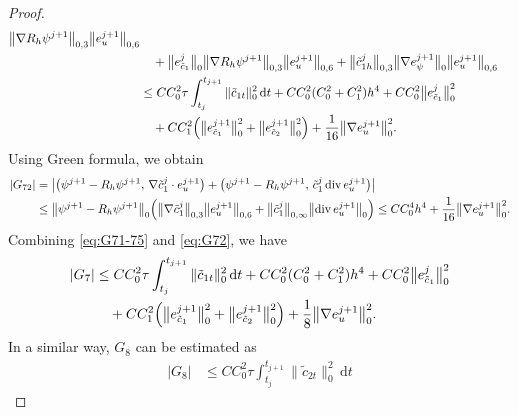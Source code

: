 \begin{proof}
\begin{align}
         \bigl\|\nabla R_{h}\psi^{j+1}\bigr\|_{0,3}\bigl\|e_{u}^{j+1}\bigr\|_{0,6}
  \nonumber\\
  &\quad + \bigl\|e_{\tilde{c}_{1}}^{j}\bigr\|_{0}
           \bigl\|\nabla R_{h}\psi^{j+1}\bigr\|_{0,3}\bigl\|e_{u}^{j+1}\bigr\|_{0,6}
         + \bigl\|\tilde{c}_{1h}^{j}\bigr\|_{0,3}
           \bigl\|\nabla e_{\psi}^{j+1}\bigr\|_{0}\bigl\|e_{u}^{j+1}\bigr\|_{0,6}
  \nonumber\\
  &\leq CC_{0}^{2}\tau\int_{t_{j}}^{t_{j+1}}\|\tilde{c}_{1t}\|_{0}^{2}\,\mathrm{d}t
    + CC_{0}^{2}(C_{0}^{2}+C_{1}^{2})h^{4}
    + CC_{0}^{2}\bigl\|e_{\tilde{c}_{1}}^{j}\bigr\|_{0}^{2}
  \nonumber\\
  &\quad + CC_{1}^{2}\Bigl(\bigl\|e_{\tilde{c}_{1}}^{j+1}\bigr\|_{0}^{2}
                           + \bigl\|e_{\tilde{c}_{2}}^{j+1}\bigr\|_{0}^{2}\Bigr)
         + \frac{1}{16}\bigl\|\nabla e_{u}^{j+1}\bigr\|_{0}^{2}.
  \label{eq:G71-75}
\end{align}
Using Green formula, we obtain
\begin{align}
  |G_{72}|
  &= \bigl|\bigl(\psi^{j+1} - R_{h}\psi^{j+1},\,
                 \nabla\tilde{c}_{1}^{j}\cdot e_{u}^{j+1}\bigr)
          + \bigl(\psi^{j+1} - R_{h}\psi^{j+1},\,
                 \tilde{c}_{1}^{j}\operatorname{div}e_{u}^{j+1}\bigr)\bigr|
  \nonumber\\
  &\leq \bigl\|\psi^{j+1} - R_{h}\psi^{j+1}\bigr\|_{0}
    \Bigl(\bigl\|\nabla\tilde{c}_{1}^{j}\bigr\|_{0,3}\bigl\|e_{u}^{j+1}\bigr\|_{0,6}
         + \bigl\|\tilde{c}_{1}^{j}\bigr\|_{0,\infty}\bigl\|\operatorname{div}e_{u}^{j+1}\bigr\|_{0}\Bigr)
  \leq CC_{0}^{4}h^{4} + \frac{1}{16}\bigl\|\nabla e_{u}^{j+1}\bigr\|_{0}^{2}.
  \label{eq:G72}
\end{align}
Combining \eqref{eq:G71-75} and \eqref{eq:G72}, we have
\begin{align}
  |G_{7}|
  &\leq CC_{0}^{2}\tau\int_{t_{j}}^{t_{j+1}}\|\tilde{c}_{1t}\|_{0}^{2}\,\mathrm{d}t
    + CC_{0}^{2}(C_{0}^{2}+C_{1}^{2})h^{4}
    + CC_{0}^{2}\bigl\|e_{\tilde{c}_{1}}^{j}\bigr\|_{0}^{2}
  \nonumber\\
  &\quad + CC_{1}^{2}\Bigl(\bigl\|e_{\tilde{c}_{1}}^{j+1}\bigr\|_{0}^{2}
                           + \bigl\|e_{\tilde{c}_{2}}^{j+1}\bigr\|_{0}^{2}\Bigr)
         + \frac{1}{8}\bigl\|\nabla e_{u}^{j+1}\bigr\|_{0}^{2}.
  \label{eq:G7}
\end{align}
In a similar way, $G_{8}$ can be estimated as
\begin{align}
  |G_{8}|
  &\leq CC_{0}^{2}\tau\int_{t_{j}}^{t_{j+1}}\|\tilde{c}_{2t}\|_{0}^{2}\,\mathrm{d}t

\end{align}
\end{proof}
